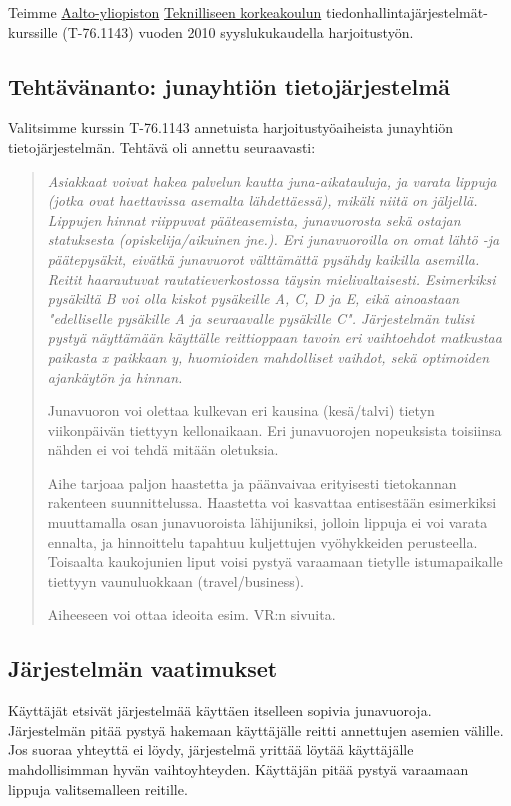 \documentclass[a4paper,twoside,titlepage,12pt]{article}
\begin{document}
Teimme \href{http://www.aalto.fi/}{Aalto-yliopiston} \href{http://www.tkk.fi/}{Teknilliseen korkeakoulun} tiedonhallintajärjestelmät-kurssille (T-76.1143) vuoden 2010 syyslukukaudella harjoitustyön.



\subsection{Tehtävänanto: junayhtiön tietojärjestelmä}

Valitsimme kurssin T-76.1143 annetuista harjoitustyöaiheista junayhtiön tietojärjestelmän. Tehtävä oli annettu seuraavasti:

\begin{quotation}
\itshape
Asiakkaat voivat hakea palvelun kautta juna-aikatauluja, ja varata lippuja (jotka ovat haettavissa asemalta lähdettäessä), mikäli niitä on jäljellä. Lippujen hinnat riippuvat pääteasemista, junavuorosta sekä ostajan statuksesta (opiskelija/aikuinen jne.). Eri junavuoroilla on omat lähtö -ja päätepysäkit, eivätkä junavuorot välttämättä pysähdy kaikilla asemilla. Reitit haarautuvat rautatieverkostossa täysin mielivaltaisesti. Esimerkiksi pysäkiltä B voi olla kiskot pysäkeille A, C, D ja E, eikä ainoastaan "edelliselle pysäkille A ja seuraavalle pysäkille C". Järjestelmän tulisi pystyä näyttämään käyttälle reittioppaan tavoin eri vaihtoehdot matkustaa paikasta x paikkaan y, huomioiden mahdolliset vaihdot, sekä optimoiden ajankäytön ja hinnan.

Junavuoron voi olettaa kulkevan eri kausina (kesä/talvi) tietyn viikonpäivän tiettyyn kellonaikaan. Eri junavuorojen nopeuksista toisiinsa nähden ei voi tehdä mitään oletuksia.

Aihe tarjoaa paljon haastetta ja päänvaivaa erityisesti tietokannan rakenteen suunnittelussa. Haastetta voi kasvattaa entisestään esimerkiksi muuttamalla osan junavuoroista lähijuniksi, jolloin lippuja ei voi varata ennalta, ja hinnoittelu tapahtuu kuljettujen vyöhykkeiden perusteella. Toisaalta kaukojunien liput voisi pystyä varaamaan tietylle istumapaikalle tiettyyn vaunuluokkaan (travel/business).

Aiheeseen voi ottaa ideoita esim. VR:n sivuita. 
\end{quotation}

\subsection{Järjestelmän vaatimukset}
Käyttäjät etsivät järjestelmää käyttäen itselleen sopivia junavuoroja.
Järjestelmän pitää pystyä hakemaan käyttäjälle reitti annettujen asemien
välille. Jos suoraa yhteyttä ei löydy, järjestelmä yrittää löytää käyttäjälle
mahdollisimman hyvän vaihtoyhteyden. Käyttäjän pitää pystyä varaamaan lippuja
valitsemalleen reitille.
\end{document}
